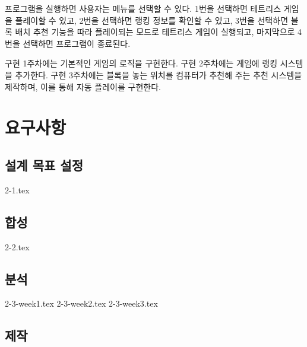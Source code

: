 프로그램을 실행하면 사용자는 메뉴를 선택할 수 있다. 1번을 선택하면 테트리스 게임을 플레이할 수 있고, 2번을 선택하면 랭킹 정보를 확인할 수 있고, 3번을 선택하면 블록 배치 추천 기능을 따라 플레이되는 모드로 테트리스 게임이 실행되고, 마지막으로 4번을 선택하면 프로그램이 종료된다.

구현 1주차에는 기본적인 게임의 로직을 구현한다. 구현 2주차에는 게임에 랭킹 시스템을 추가한다. 구현 3주차에는 블록을 놓는 위치를 컴퓨터가 추천해 주는 추천 시스템을 제작하며, 이를 통해 자동 플레이를 구현한다.

\section{요구사항}
\subsection{설계 목표 설정}
{2-1.tex}

\subsection{합성}
{2-2.tex}

\subsection{분석}
{2-3-week1.tex}
{2-3-week2.tex}
{2-3-week3.tex}

\subsection{제작}

